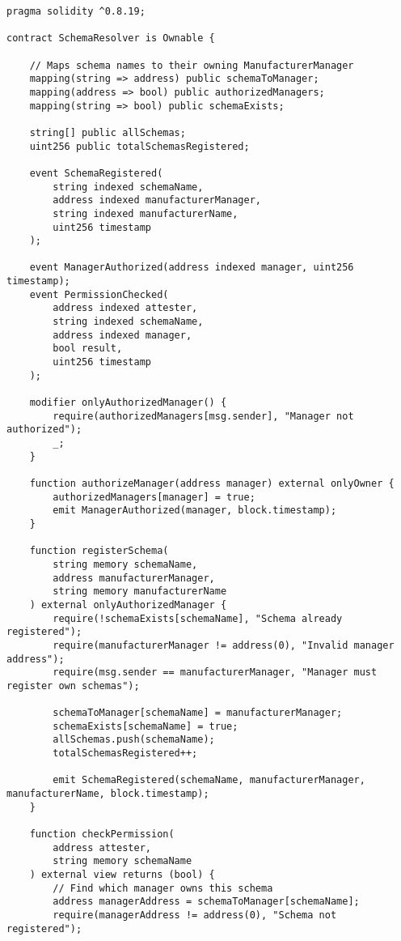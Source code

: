 \documentclass[11pt,a4paper]{article}
\begin{document}
\begin{verbatim}
pragma solidity ^0.8.19;

contract SchemaResolver is Ownable {
    
    // Maps schema names to their owning ManufacturerManager
    mapping(string => address) public schemaToManager;
    mapping(address => bool) public authorizedManagers;
    mapping(string => bool) public schemaExists;
    
    string[] public allSchemas;
    uint256 public totalSchemasRegistered;
    
    event SchemaRegistered(
        string indexed schemaName, 
        address indexed manufacturerManager,
        string indexed manufacturerName,
        uint256 timestamp
    );
    
    event ManagerAuthorized(address indexed manager, uint256 timestamp);
    event PermissionChecked(
        address indexed attester,
        string indexed schemaName,
        address indexed manager,
        bool result,
        uint256 timestamp
    );
    
    modifier onlyAuthorizedManager() {
        require(authorizedManagers[msg.sender], "Manager not authorized");
        _;
    }
    
    function authorizeManager(address manager) external onlyOwner {
        authorizedManagers[manager] = true;
        emit ManagerAuthorized(manager, block.timestamp);
    }
    
    function registerSchema(
        string memory schemaName,
        address manufacturerManager,
        string memory manufacturerName
    ) external onlyAuthorizedManager {
        require(!schemaExists[schemaName], "Schema already registered");
        require(manufacturerManager != address(0), "Invalid manager address");
        require(msg.sender == manufacturerManager, "Manager must register own schemas");
        
        schemaToManager[schemaName] = manufacturerManager;
        schemaExists[schemaName] = true;
        allSchemas.push(schemaName);
        totalSchemasRegistered++;
        
        emit SchemaRegistered(schemaName, manufacturerManager, manufacturerName, block.timestamp);
    }
    
    function checkPermission(
        address attester,
        string memory schemaName
    ) external view returns (bool) {
        // Find which manager owns this schema
        address managerAddress = schemaToManager[schemaName];
        require(managerAddress != address(0), "Schema not registered");
        

\end{verbatim}
\end{document}
